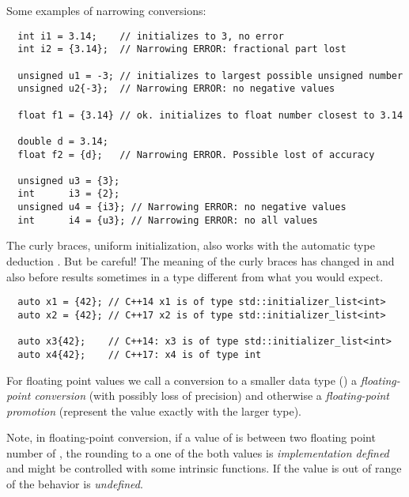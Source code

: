 Some examples of narrowing conversions:
\begin{verbatim}
  int i1 = 3.14;    // initializes to 3, no error
  int i2 = {3.14};  // Narrowing ERROR: fractional part lost

  unsigned u1 = -3; // initializes to largest possible unsigned number
  unsigned u2{-3};  // Narrowing ERROR: no negative values

  float f1 = {3.14} // ok. initializes to float number closest to 3.14

  double d = 3.14;
  float f2 = {d};   // Narrowing ERROR. Possible lost of accuracy

  unsigned u3 = {3};
  int      i3 = {2};
  unsigned u4 = {i3}; // Narrowing ERROR: no negative values
  int      i4 = {u3}; // Narrowing ERROR: no all values
\end{verbatim}

\begin{rem}
  The\marginpar{[\cxx{17}]} curly braces, \ie uniform initialization, also works with the automatic type deduction . But be careful! The meaning of the curly braces has changed in  and also before results sometimes in a type different from what you would expect.
  \begin{verbatim}
  auto x1 = {42}; // C++14 x1 is of type std::initializer_list<int>
  auto x2 = {42}; // C++17 x2 is of type std::initializer_list<int>

  auto x3{42};    // C++14: x3 is of type std::initializer_list<int>
  auto x4{42};    // C++17: x4 is of type int
  \end{verbatim}
\end{rem}

\begin{defn}
  For floating point values we call a conversion to a smaller data type (\eg {}) a \emph{floating-point conversion} (with possibly loss of precision) and otherwise a \emph{floating-point promotion} (represent the value exactly with the larger type).
\end{defn}

\begin{rem}
  Note, in floating-point conversion, if a value of  is between two floating point number of , the rounding to a one of the both values is \emph{implementation defined} and might be controlled with some intrinsic functions. If the value is out of range of  the behavior is \emph{undefined}.
\end{rem}

